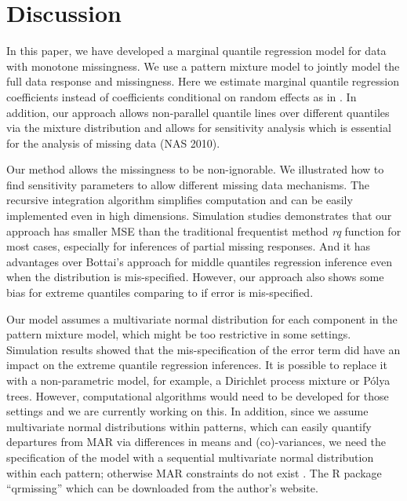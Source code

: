 \documentclass[useAMS,usenatbib,referee]{biom}
\newcommand{\polya}{P\'{o}lya} \newcommand{\yobs}{\bmath y_{\itl{obs}}}
\begin{document}
\section{Discussion}
\label{sec:discussion}

In this paper, we have developed a marginal quantile regression model
for data with monotone missingness. We use a pattern mixture model to
jointly model the full data response and missingness. Here we estimate
marginal quantile regression coefficients instead of coefficients
conditional on random effects as in \citet{yuan2010}. In addition, our
approach allows non-parallel quantile lines over different quantiles
via the mixture distribution and allows for sensitivity analysis which
is essential for the analysis of missing data (NAS 2010).

Our method allows the missingness to be non-ignorable.
We illustrated how to find sensitivity parameters to allow different missing data mechanisms. The
recursive integration algorithm simplifies computation and can be
easily implemented even in high dimensions. Simulation studies
demonstrates that our approach has smaller MSE than the traditional
frequentist method \textit{rq} function for most cases, especially for
inferences of partial missing responses. And it has advantages over
Bottai's approach for middle quantiles regression inference even when
the distribution is mis-specified.  However, our approach also shows
some bias for extreme quantiles comparing to \citet{bottai2013} if
error is mis-specified.

Our model assumes a multivariate normal distribution for each
component in the pattern mixture model, which might be too restrictive
in some settings. Simulation results showed that the mis-specification
of the error term did have an impact on the extreme quantile
regression inferences.  It is possible to replace it with a
non-parametric model, for example, a Dirichlet process mixture or
\polya{} trees. However, computational algorithms would need to be
developed for those settings and we are currently working on this. In addition, since we assume
multivariate normal distributions within patterns, which can easily
quantify departures from MAR via differences in means and
(co)-variances, we need the specification of the model with a sequential
multivariate normal distribution within each pattern; otherwise MAR
constraints do not exist \citep{wang2011}.
The R package ``qrmissing'' which can be downloaded from the author's website.

\backmatter
\end{document}
